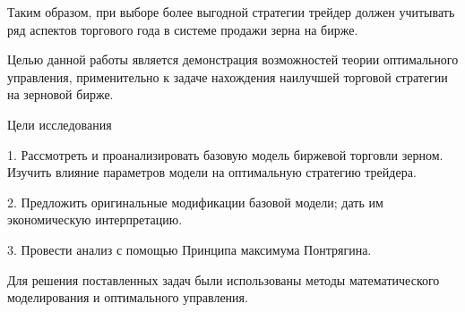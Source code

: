 Таким образом, при выборе более выгодной стратегии трейдер должен учитывать ряд аспектов торгового года в системе продажи зерна на бирже.


Целью данной работы является демонстрация возможностей теории оптимального управления, применительно к задаче нахождения наилучшей торговой стратегии на зерновой бирже.


Цели исследования


1. Рассмотреть и проанализировать базовую модель биржевой торговли зерном. Изучить влияние параметров модели на оптимальную стратегию трейдера.


2. Предложить оригинальные модификации базовой модели; дать им экономическую интерпретацию.


3. Провести анализ с помощью Принципа максимума Понтрягина.


Для решения поставленных задач были использованы методы математического моделирования и оптимального управления.
